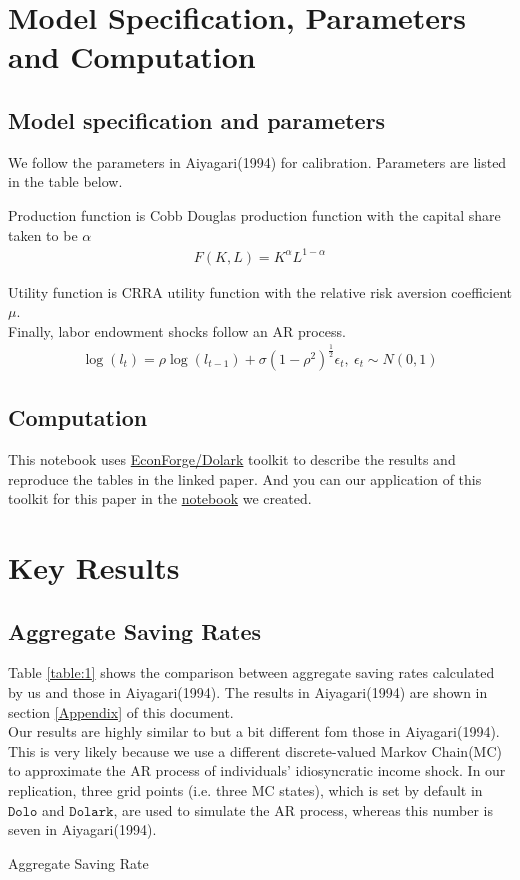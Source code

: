 \documentclass[]{article}
\begin{document}
\section{Model Specification, Parameters and Computation}
\subsection{Model specification and parameters}
We follow the parameters in Aiyagari(1994) for calibration. Parameters are listed in the table below. 


Production function is Cobb Douglas production function with the capital share taken to be $\alpha$
\begin{align}
	F(K,L) = K^\alpha L^{1-\alpha}
\end{align}

Utility function is CRRA utility function with the relative risk aversion coefficient $\mu$.\\

Finally, labor endowment shocks follow an AR process.
\begin{align}
\log(l_t)=\rho\log(l_{t-1})+\sigma(1-\rho^2)^{\frac{1}{2}}\epsilon_{t}, \ \epsilon_t \sim N(0,1)   
\end{align}



\subsection{Computation}
This notebook uses \href{http://www.econforge.org/dolark/}{EconForge/Dolark} toolkit to describe the results and reproduce the tables in the linked paper. And you can our application of this toolkit for this paper in the \href{run:../Aiyagari1994QJE.ipynb}{notebook} we created.


\section{Key Results}
\subsection{Aggregate Saving Rates}
Table \ref{table:1} shows the comparison between aggregate saving rates calculated by us and those in Aiyagari(1994). The results in Aiyagari(1994) are shown in section \ref{Appendix} of this document.\\

Our results are highly similar to but a bit different fom those in Aiyagari(1994). This is very likely because we use a different discrete-valued Markov Chain(MC) to approximate the AR process of individuals' idiosyncratic income shock. In our replication, three grid points (i.e. three MC states), which is set by default in $\texttt{Dolo}$ and $\texttt{Dolark}$, are used to simulate the AR process, whereas this number is seven in Aiyagari(1994).
\begin{table}[H]
	\scalebox{.7}{}
	\caption{Aggregate Saving Rate}
	\label{table:2}
\end{table}
\end{document}
